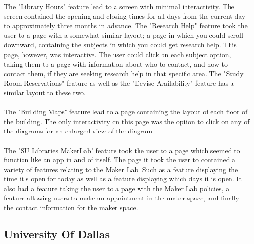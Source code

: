             \paragraph{}
            The "Library Hours" feature lead to a screen with minimal interactivity. The screen contained the opening and closing times for all days from the current day to approximately three months in advance. The "Research Help" feature took the user to a page with a somewhat similar layout; a page in which you could scroll downward, containing the subjects in which you could get research help. This page, however, was interactive. The user could click on each subject option, taking them to a page with information about who to contact, and how to contact them, if they are seeking research help in that specific area.  The "Study Room Reservations" feature as well as the "Devise Availability" feature has a similar layout to these two.
            \paragraph{}
            The "Building Maps" feature lead to a page containing the layout of each floor of the building. The only interactivity on this page was the option to click on any of the diagrams for an enlarged view of the diagram. 
            \paragraph{}
            The "SU Libraries MakerLab" feature took the user to a page which seemed to function like an app in and of itself. The page it took the user to contained a variety of features relating to the Maker Lab. Such as a feature displaying the time it's open for today as well as a feature displaying which days it is open. It also had a feature taking the user to a page with the Maker Lab policies, a feature allowing users to make an appointment in the maker space, and finally the contact information for the maker space.
        \subsection{University Of Dallas}
